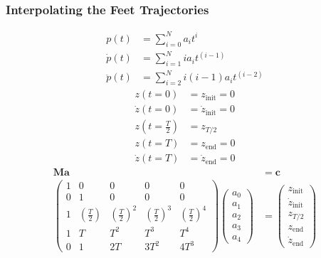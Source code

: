 \subsubsection{Interpolating the Feet Trajectories}
\begin{align}
	p(t) &= \sum_{i = 0}^{N}a_it^i 
	\label{eq::313_pos_poly}\\
	\dot{p}(t) &= \sum_{i = 1}^{N}ia_it^{(i-1)} 
	\label{eq::313_vel_poly}\\
	\ddot{p}(t) &= \sum_{i = 2}^{N}i(i-1)a_it^{(i-2)}
	\label{eq::313_acc_poly}
\end{align}
\begin{align}
	z(t = 0) &= z_\text{init} = 0 \\
	\dot{z}(t = 0) &= \dot{z}_\text{init} = 0 \\
	z(t = \frac{T}{2}) &= z_{T/2}\\  
	z(t = T) &= z_\text{end} = 0 \\
	\dot{z}(t = T) &= \dot{z}_\text{end} = 0 
\end{align}
\begin{align}
	\bm{M}\bm{a} &= \bm{c} \\
	\begin{pmatrix}
		1 & 0 & 0              & 0              & 0 \\
		0 & 1 & 0              & 0              & 0 \\
		1 & \left(\frac{T}{2}\right)        & \left(\frac{T}{2}\right)^2  & \left(\frac{T}{2}\right)^3 & \left(\frac{T}{2}\right)^4 \\
		1 & T & T^2            & T^3            & T^4 \\
		0 & 1 & 2T             & 3T^2           & 4T^3 
	\end{pmatrix}
	\begin{pmatrix}
		a_0 \\
		a_1 \\
		a_2 \\
		a_3 \\
		a_4
	\end{pmatrix} &=
	\begin{pmatrix}
		z_\text{init} \\
		\dot{z}_\text{init} \\
		z_{T/2} \\
		z_\text{end}\\
		\dot{z}_\text{end}
	\end{pmatrix}
\end{align}
